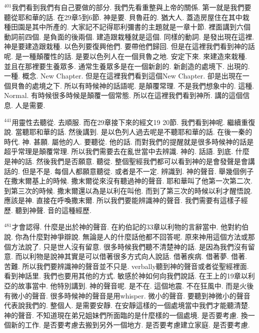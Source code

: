 \documentclass{book}
\begin{document}
$^{401}$我們看到我們有自己要做的部分.
我們先看重整與上帝的關係.
第一就是我們要聽從耶和華的話.
在29章5到6節.
神是要.
貝魯莊的.
猶大人.
蓋造房屋住在其中栽種田園是其中所產的.
大家記不記得耶利彌書的主題就是一章十節.
裡面講到六個動詞前四個.
是負面的後兩個.
建造跟栽種就是這個.
同樣的動詞.
是發出現在這裡.
神是要建造跟栽種.
以色列要復興他們.
要帶他們歸回.
但是在這裡我們看到神的話呢.
是一種顛覆性的話.
是要以色列人在一個貝魯之地.
安定下來.
來建造來栽種.
並且在那裡要生養眾多.
通常生養眾多是在一個新創的.
新創造的處境下.
出現的.
一種.
概念.
New Chapter.
但是在這裡我們看到這個New Chapter.
卻是出現在一個貝魯的處境之下.
所以有時候神的話語呢.
是顛覆常理.
不是我們想象中的.
這種.
Normal.
有時候很多時候是顛覆一個常態.
所以在這裡我們看到神所.
講的這個信息.
人是需要.

$^{441}$用靈性去聽從.
去順服.
而在29章接下來的經文19 20節.
我們看到神呢.
繼續重復說.
當聽耶和華的話.
然後講到.
是以色列人過去呢是不聽耶和華的話.
在後一秦的時代.
神.
甚願.
屬他的人.
要聽從.
他的話.
而對我們的提醒就是很多時候神的話是超乎常理是顛覆常理.
所以我們需要去在亂世當中去辨識.
神的.
話語.
到底.
什麼是神的話.
然後我們是否願意.
聽從.
整個聖經我們都可以看到神的是會發聲是會講話的.
但是不是.
每個人都願意聽從.
或者是不一定.
辨識到.
神的聲音.
舉幾個例子在撒末爾基上的時候.
撒末爾從來沒有聽過神的聲音.
耶和華叫了他第一次第二次.
到第三次的時候.
撒末爾還以為是以利在叫他.
而到了第三次的時候以利才醒悟說.
應該是神.
直接在呼喚撒末爾.
所以我們要能辨識神的聲音.
我們需要有這樣子經歷.
聽到神聲.
音的這種經歷.

$^{481}$才會認得.
什麼是出於神的聲音.
在約伯記的33章以利物的言辭當中.
他對約伯說.
你為什麼對神爭辯說.
無論是人的什麼話他都不回答呢.
原來神用這個方法或那個方法說了.
只是世人沒有留意.
很多時候我們聽不清楚神的話.
是因為我們沒有留意.
而以利物是說神其實是可以借著很多方式向人說話.
借著疾病.
借著夢.
借著.
苦難.
所以我們要辨識神的聲音並不只是.
verbally聽到神的聲音或者從聖經裡面.
看到神話里.
我們也要用其他的方式.
敏感於神如何向我們說話.
在王上的19章以利亞的故事當中.
他特別講到.
神的聲音呢.
是不在.
這個地震.
不在狂風中.
而是火後有微小的聲音.
很多時候神的聲音是用whisper.
微小的聲音.
要聽到神微小的聲音代表說我們的.
整個人.
是需要安靜.
在安靜這樣的一個處境當中我們才能聽清楚.
神的聲音.
不知道現在弟兄姐妹們所面臨的是什麼樣的一個處境.
是否要考慮.
換一個新的工作.
是否要考慮去搬到另外一個地方.
是否要考慮建立家庭.
是否要考慮.
\end{document}

